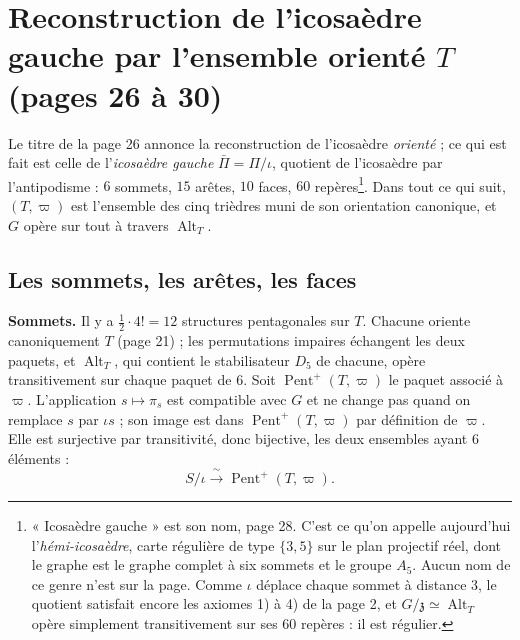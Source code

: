 \documentclass[11pt,a4paper]{article}
\begin{document}
\section*{Reconstruction de l'icosaèdre gauche par l'ensemble orienté $T$ (pages 26 à 30)}

Le titre de la page 26 annonce la reconstruction de l'icosaèdre
\emph{orienté} ; ce qui est fait est celle de l'\emph{icosaèdre gauche}
$\bar\Pi = \Pi/\iota$, quotient de l'icosaèdre par l'antipodisme : $6$ sommets,
$15$ arêtes, $10$ faces, $60$ repères\footnote{« Icosaèdre gauche » est son
nom, page 28. C'est ce qu'on appelle aujourd'hui l'\emph{hémi-icosaèdre}, carte
régulière de type $\{3, 5\}$ sur le plan projectif réel, dont le graphe est le
graphe complet à six sommets et le groupe $A_5$. Aucun nom de ce genre n'est
sur la page. Comme $\iota$ déplace chaque sommet à distance $3$, le quotient
satisfait encore les axiomes 1) à 4) de la page 2, et $G/\mathfrak{z} \simeq
\operatorname{Alt}_T$ opère simplement transitivement sur ses $60$ repères :
il est régulier.}. Dans tout ce qui suit, $(T, \varpi)$ est l'ensemble des cinq
trièdres muni de son orientation canonique, et $G$ opère sur tout à travers
$\operatorname{Alt}_T$.

\subsection*{Les sommets, les arêtes, les faces}

\textbf{Sommets.} Il y a $\frac12 \cdot 4! = 12$ structures pentagonales sur
$T$. Chacune oriente canoniquement $T$ (page 21) ; les permutations impaires
échangent les deux paquets, et $\operatorname{Alt}_T$, qui contient le
stabilisateur $D_5$ de chacune, opère transitivement sur chaque paquet de
$6$. Soit $\operatorname{Pent}^{+}(T, \varpi)$ le paquet associé à $\varpi$.
L'application $s \mapsto \pi_s$ est compatible avec $G$ et ne change pas quand
on remplace $s$ par $\iota s$ ; son image est dans $\operatorname{Pent}^{+}(T,
\varpi)$ par définition de $\varpi$. Elle est surjective par transitivité, donc
bijective, les deux ensembles ayant $6$ éléments :
\[
S/\iota \xrightarrow{\ \sim\ } \operatorname{Pent}^{+}(T, \varpi).
\]
\end{document}

